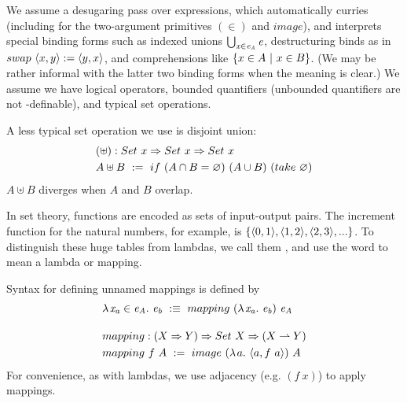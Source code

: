\documentclass[preprint]{sigplanconf}
\newcommand{\pto}{\rightharpoonup}
\begin{document}
We assume a desugaring pass over \lzfclang expressions, which automatically curries (including for the two-argument primitives $(\in)$ and $image$), and interprets special binding forms such as indexed unions $\textstyle\bigcup_{\mathit{x} \in \mathit{e_A}}\mathit{e}$, destructuring binds as in $swap~\langle{x,y}\rangle := \langle{y,x}\rangle$, and comprehensions like $\lbrace {x \in A} \ \lvert\ {x \in B} \rbrace$.
(We may be rather informal with the latter two binding forms when the meaning is clear.)
We assume we have logical operators, bounded quantifiers (unbounded quantifiers are not \lzfclang-definable), and typical set operations.

A less typical set operation we use is disjoint union:
\begin{equation}
\begin{aligned}
	&(\uplus) : Set~x \Rightarrow Set~x \Rightarrow Set~x \\
	&A \uplus B \ := \ if~(A \cap B = \varnothing)~(A \cup B)~(take~\varnothing)
\end{aligned}
\end{equation}
$A \uplus B$ diverges when $A$ and $B$ overlap.

In set theory, functions are encoded as sets of input-output pairs.
The increment function for the natural numbers, for example, is $\{{\langle{0,1}\rangle,\langle{1,2}\rangle,\langle{2,3}\rangle,...}\}$.
To distinguish these huge tables from lambdas, we call them , and use the word  to mean a lambda or mapping.

Syntax for defining unnamed mappings is defined by
\begin{align}
	&\fun{\mathit{x_a} \in \mathit{e_A}}{\mathit{e_b}} \ :\equiv\ mapping~(\fun{\mathit{x_a}}\mathit{e_b})~\mathit{e_A} \\
\nonumber\\[-6pt]
	&\begin{aligned}
		&mapping : (X \tto Y) \tto Set~X \tto (X \pto Y) \\
		&mapping~f~A \ := \ image~(\fun{a}{\pair{a,f~a}})~A
	\end{aligned}
\end{align}
For convenience, as with lambdas, we use adjacency (e.g. $(f~x)$) to apply mappings.
\end{document}
